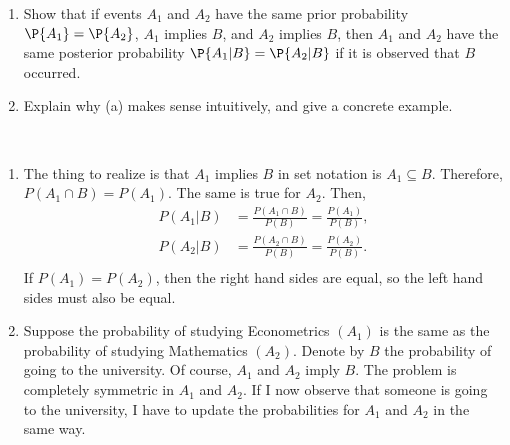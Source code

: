 

\setcounter{theorem}{5}

\begin{exercise} [BH.2.9] 
 \begin{enumerate}
		\item Show that if events $A_1$ and $A_2$ have the same prior probability $\P{A_1} = \P{A_2}$, $A_1$ implies $B$, and $A_2$ implies $B$, then $A_1$ and $A_2$ have the same posterior probability $\P{A_1|B} = \P{A_2|B}$ if it is observed that $B$ occurred.
		\item Explain why (a) makes sense intuitively, and give a concrete example.
	\end{enumerate}
\begin{solution}~
	\begin{enumerate}
		\item The thing to realize is that $A_{1}$ implies $B$ in set notation is $A_{1}\subseteq B$. Therefore, $P(A_{1}\cap B) = P(A_1)$. The same is true for $A_{2}$. Then,
		\begin{align*}
			P(A_{1}|B) &= \frac{P(A_{1}\cap B)}{P(B)} = \frac{P(A_{1})}{P(B)},\\
			P(A_{2}|B) &= \frac{P(A_{2}\cap B)}{P(B)} = \frac{P(A_{2})}{P(B)}.\\
		\end{align*}
		If $P(A_{1})=P(A_{2})$, then the right hand sides are equal, so the left hand sides must also be equal.
		\item Suppose the probability of studying Econometrics $(A_{1})$ is the same as the probability of studying Mathematics $(A_{2})$. Denote by $B$ the probability of going to the university. Of course, $A_{1}$ and $A_{2}$ imply $B$. The problem is completely symmetric in $A_{1}$ and $A_{2}$. If I now observe that someone is going to the university, I have to update the probabilities for $A_{1}$ and $A_{2}$ in the same way. 
	\end{enumerate}
  \end{solution}
\end{exercise}


